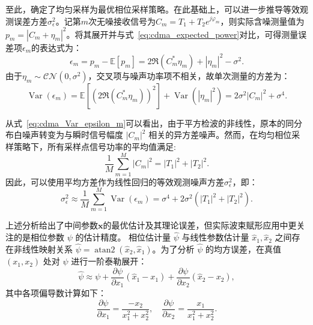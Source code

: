 至此，确定了均匀采样为最优相位采样策略。在此基础上，可以进一步推导等效观测误差方差$\sigma_\epsilon^2$。记第$m$次无噪接收信号为$C_m = T_1 + T_2 e^{j\varphi_m}$，则实际含噪测量值为$p_m = |C_m + \eta_m|^2$。将其展开并与式~\eqref{eq:cdma_expected_power}对比，可得测量误差项$\epsilon_m$的表达式为：
\begin{equation}
	\epsilon_m = p_m - \mathbb{E}[p_m] = 2\Re(C_m^* \eta_m) + |\eta_m|^2 - \sigma^2.
\end{equation}
由于$\eta_m \sim \mathcal{CN}(0, \sigma^2)$，交叉项与噪声功率项不相关，故单次测量的方差为：
\begin{equation}\label{eq:cdma_Var_epsilon_m}
	\operatorname{Var}(\epsilon_m) = \mathbb{E}\left[ (2\Re(C_m^* \eta_m))^2 \right] + \operatorname{Var}(|\eta_m|^2) = 2\sigma^2|C_m|^2 + \sigma^4.
\end{equation}

从式~\eqref{eq:cdma_Var_epsilon_m}可以看出，由于平方检波的非线性，原本的同分布白噪声转变为与瞬时信号幅度 $|C_m|^2$ 相关的异方差噪声。然而，在均匀相位采样策略下，所有采样点信号功率的平均值满足:
\begin{equation}
	\frac{1}{M}\sum_{m=1}^{M}|C_m|^2 = |T_1|^2 + |T_2|^2.
\end{equation}
因此，可以使用平均方差作为线性回归的等效观测噪声方差$\sigma_\epsilon^2$，即：
\begin{equation}\label{eq:cdma_sigma_eps}
	\sigma_\epsilon^2 \approx \frac{1}{M}\sum_{m=1}^{M}\operatorname{Var}(\epsilon_m) = \sigma^4 + 2\sigma^2(|T_1|^2 + |T_2|^2).
\end{equation}


上述分析给出了中间参数$\bm{x}$的最优估计及其理论误差，但实际波束赋形应用中更关注的是相位参数 $\psi$ 的估计精度。
相位估计量 $\hat{\psi}$ 与线性参数估计量 $\hat{x}_1, \hat{x}_2$ 之间存在非线性映射关系 $\hat{\psi} = \operatorname{atan2}(\hat{x}_2, \hat{x}_1)$。为了分析 $\hat{\psi}$ 的均方误差，在真值 $(x_1, x_2)$ 处对 $\hat{\psi}$ 进行一阶泰勒展开：
\begin{equation}
	\hat{\psi} \approx 
	\psi + \frac{\partial \psi}{\partial x_1} (\hat{x}_1 - x_1) + \frac{\partial \psi}{\partial x_2} (\hat{x}_2 - x_2),
\end{equation}
其中各项偏导数计算如下：
\begin{equation}
	\frac{\partial \psi}{\partial x_1} = \frac{-x_2}{x_1^2 + x_2^2}, \quad\frac{\partial \psi}{\partial x_2} = \frac{x_1}{x_1^2 + x_2^2}.
\end{equation}

